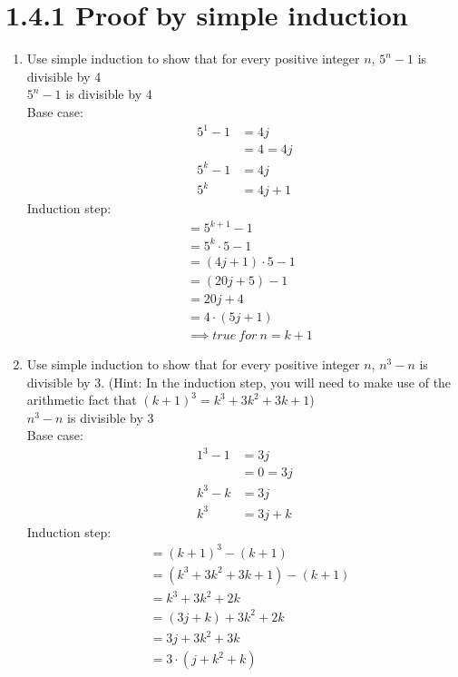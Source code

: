 \documentclass{article}
\begin{document}
\section*{1.4.1 Proof by simple induction}
\begin{enumerate}
    \item Use simple induction to show that for every positive integer $n$, $5^n - 1$ is divisible by 4\\
    $5^{n}-1$ is divisible by 4\\
    Base case:
    \begin{align*}
        5^{1}-1 &= 4j\\
        &= 4 = 4j\\
        5^{k}-1 &= 4j\\
        5^{k}&= 4j+1
    \end{align*}
    Induction step:
    \begin{align*}
        &= 5^{k+ 1}-1\\
        &= 5^{k} \cdot 5 - 1\\
        &=(4j+1) \cdot 5 - 1\\
        &=(20j + 5) -1\\
        &=20j + 4\\
        &=4\cdot(5j + 1)\\
        &\implies true\ for\ n = k + 1
    \end{align*}
    \item Use simple induction to show that for every positive integer $n$, $n^3- n$ is divisible by 3. (Hint: In the induction step, you will need to make use of the arithmetic fact that $(k+1)^3 = k^3 + 3k^2 + 3k +1$)\\
    $n^3- n$ is divisible by 3\\
    Base case:
    \begin{align*}
        1^3- 1 &= 3j\\
        &= 0 = 3j\\
        k^{3}-k &= 3j\\
        k^{3}&= 3j+k
    \end{align*}
    Induction step:
    \begin{align*}
        &= (k + 1)^{3}-(k +1)\\
        &= (k^3 + 3k^2 + 3k +1) - (k +1)\\
        &= k^3 + 3k^2 + 2k\\
        &= (3j+k) + 3k^2 + 2k\\
        &= 3j+ 3k^2 + 3k\\
        &=3\cdot(j + k^2 + k)\\

\end{align*}
\end{enumerate}
\end{document}
